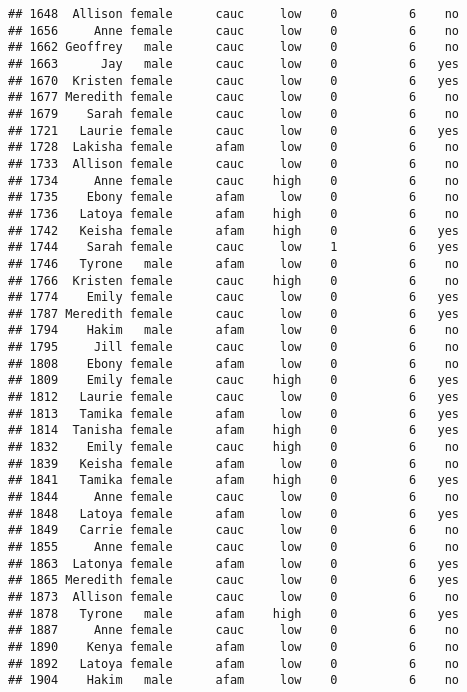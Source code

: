 \documentclass[
]{article}
\begin{document}
\begin{verbatim}
## 1648  Allison female      cauc     low    0          6    no
## 1656     Anne female      cauc     low    0          6    no
## 1662 Geoffrey   male      cauc     low    0          6    no
## 1663      Jay   male      cauc     low    0          6   yes
## 1670  Kristen female      cauc     low    0          6   yes
## 1677 Meredith female      cauc     low    0          6    no
## 1679    Sarah female      cauc     low    0          6    no
## 1721   Laurie female      cauc     low    0          6   yes
## 1728  Lakisha female      afam     low    0          6    no
## 1733  Allison female      cauc     low    0          6    no
## 1734     Anne female      cauc    high    0          6    no
## 1735    Ebony female      afam     low    0          6    no
## 1736   Latoya female      afam    high    0          6    no
## 1742   Keisha female      afam    high    0          6   yes
## 1744    Sarah female      cauc     low    1          6   yes
## 1746   Tyrone   male      afam     low    0          6    no
## 1766  Kristen female      cauc    high    0          6    no
## 1774    Emily female      cauc     low    0          6   yes
## 1787 Meredith female      cauc     low    0          6   yes
## 1794    Hakim   male      afam     low    0          6    no
## 1795     Jill female      cauc     low    0          6    no
## 1808    Ebony female      afam     low    0          6    no
## 1809    Emily female      cauc    high    0          6   yes
## 1812   Laurie female      cauc     low    0          6   yes
## 1813   Tamika female      afam     low    0          6   yes
## 1814  Tanisha female      afam    high    0          6   yes
## 1832    Emily female      cauc    high    0          6    no
## 1839   Keisha female      afam     low    0          6    no
## 1841   Tamika female      afam    high    0          6   yes
## 1844     Anne female      cauc     low    0          6    no
## 1848   Latoya female      afam     low    0          6   yes
## 1849   Carrie female      cauc     low    0          6    no
## 1855     Anne female      cauc     low    0          6    no
## 1863  Latonya female      afam     low    0          6   yes
## 1865 Meredith female      cauc     low    0          6   yes
## 1873  Allison female      cauc     low    0          6    no
## 1878   Tyrone   male      afam    high    0          6   yes
## 1887     Anne female      cauc     low    0          6    no
## 1890    Kenya female      afam     low    0          6    no
## 1892   Latoya female      afam     low    0          6    no
## 1904    Hakim   male      afam     low    0          6    no

\end{verbatim}
\end{document}
